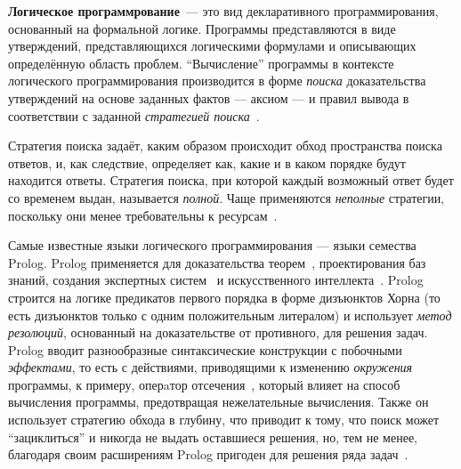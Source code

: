 {\bf Логическое программрование}~--- это вид декларативного программирования,
основанный на формальной логике. Программы представляются в виде
утверждений, представляющихся логическими формулами и описывающих
определённую область проблем.
``Вычисление'' программы в контексте логического программирования производится
в форме \emph{поиска} доказательства утверждений на основе заданных
фактов --- аксиом --- и правил вывода в соответствии с заданной
\emph{стратегией поиска}~\cite{logicMJ}.

Стратегия поиска задаёт,
каким образом происходит обход пространства поиска ответов, и,
как следствие, определяет как, какие и в каком порядке будут находится
ответы. Стратегия поиска, при которой каждый возможный ответ будет со временем
выдан, называется \emph{полной}. Чаще применяются \emph{неполные} стратегии,
поскольку они менее требовательны к ресурсам~\cite{currySearch}.

Самые известные языки логического программирования --- языки семества Prolog.
Prolog применяется для доказательства теорем~\cite{prologTheorem},
проектирования баз знаний, создания экспертных систем~\cite{prologExSys}
и искусственного интеллекта~\cite{prologInt}.
Prolog строится на логике предикатов первого порядка в форме дизъюнктов
Хорна (то есть дизъюнктов только с одним положительным литералом) и
использует \emph{метод резолюций}, основанный на доказательстве от
противного, для решения задач.
Prolog вводит разнообразные синтаксические конструкции с
побочными \emph{эффектами}, то есть с действиями, приводящими к изменению
\emph{окружения} программы, к примеру, оперaтор отсечения~,
который влияет на способ вычисления программы, предотвращая нежелательные
вычисления.
Также он использует стратегию обхода в глубину, что приводит к тому, что
поиск может ``зациклиться'' и никогда не выдать оставшиеся решения,
но, тем не менее, благодаря своим расширениям Prolog пригоден для решения
ряда задач~\cite{logicMJ}.




